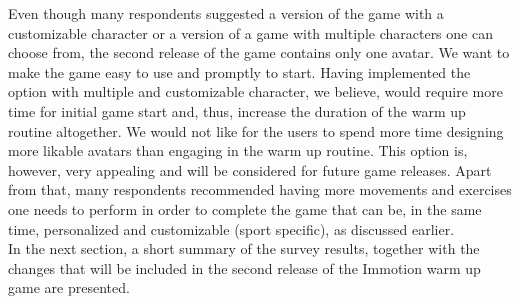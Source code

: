 Even though many respondents suggested a version of the game with a customizable character or a version of a game with multiple characters one can choose from, the second release of the game contains only one avatar. We want to make the game easy to use and promptly to start. Having implemented the option with multiple and customizable character, we believe, would require more time for initial game start and, thus, increase the duration of the warm up routine altogether. We would not like for the users to spend more time designing more likable avatars than engaging in the warm up routine. This option is, however, very appealing and will be considered for future game releases. Apart from that, many respondents recommended having more movements and exercises one needs to perform in order to complete the game that can be, in the same time, personalized and customizable (sport specific), as discussed earlier.\\In the next section, a short summary of the survey results, together with the changes that will be included in the second release of the Immotion warm up game are presented.
